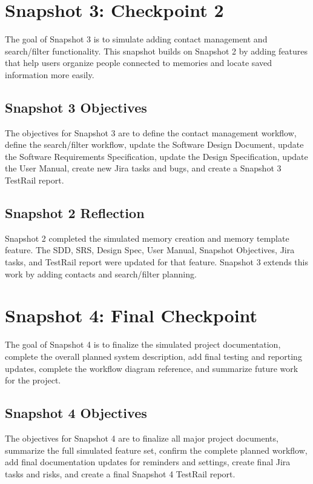 \documentclass{article}
\begin{document}
\section{Snapshot 3: Checkpoint 2}

The goal of Snapshot 3 is to simulate adding contact management and search/filter functionality. This snapshot builds on Snapshot 2 by adding features that help users organize people connected to memories and locate saved information more easily.

\subsection{Snapshot 3 Objectives}

The objectives for Snapshot 3 are to define the contact management workflow, define the search/filter workflow, update the Software Design Document, update the Software Requirements Specification, update the Design Specification, update the User Manual, create new Jira tasks and bugs, and create a Snapshot 3 TestRail report.

\subsection{Snapshot 2 Reflection}

Snapshot 2 completed the simulated memory creation and memory template feature. The SDD, SRS, Design Spec, User Manual, Snapshot Objectives, Jira tasks, and TestRail report were updated for that feature. Snapshot 3 extends this work by adding contacts and search/filter planning.

\section{Snapshot 4: Final Checkpoint}

The goal of Snapshot 4 is to finalize the simulated project documentation, complete the overall planned system description, add final testing and reporting updates, complete the workflow diagram reference, and summarize future work for the project.

\subsection{Snapshot 4 Objectives}

The objectives for Snapshot 4 are to finalize all major project documents, summarize the full simulated feature set, confirm the complete planned workflow, add final documentation updates for reminders and settings, create final Jira tasks and risks, and create a final Snapshot 4 TestRail report.
\end{document}
